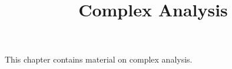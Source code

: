 

%



\title{Complex Analysis}

\maketitle

\label{section-phantom}

This chapter contains material on complex analysis.

\ChapterTableOfContents

\begin{appendices}

\end{appendices}

